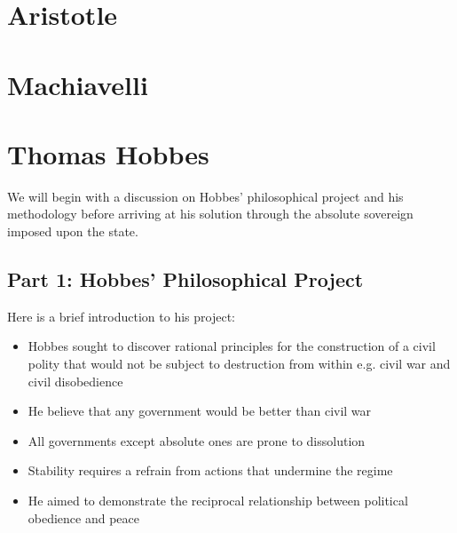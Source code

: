 \documentclass[12pt, letterpaper]{article}
\begin{document}
\newpage
\section{Aristotle}


\newpage
\section{Machiavelli}


\newpage
\section{Thomas Hobbes}
We will begin with a discussion on Hobbes' philosophical project and his methodology before arriving at his solution through the absolute sovereign imposed upon the state.

\subsection{Part 1: Hobbes' Philosophical Project}
Here is a brief introduction to his project:
\begin{itemize}
	\item Hobbes sought to discover rational principles for the construction of a civil polity that would not be subject to destruction from within e.g. civil war and civil disobedience
	\item He believe that any government would be better than civil war
	\item All governments except absolute ones are prone to dissolution
	\item Stability requires a refrain from actions that undermine the regime
	\item He aimed to demonstrate the reciprocal relationship between political obedience and peace
\end{itemize}
\end{document}
